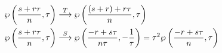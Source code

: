 \begin{equation}
  \begin{split}
  \wp\left( {s+r\tau\over n},\tau \right) &\stackrel{T}{\longrightarrow}
  \wp\left( {(s+r)+r\tau\over n},\tau \right)\\
    \wp\left( {s+r\tau\over n},\tau \right) &\stackrel{S}{\longrightarrow}
    \wp\left( {-r+s\tau\over n\tau},-{1\over\tau} \right) = \tau^2
  \wp\left( {-r+s\tau\over n},\tau \right) 
  \end{split}
\end{equation}

